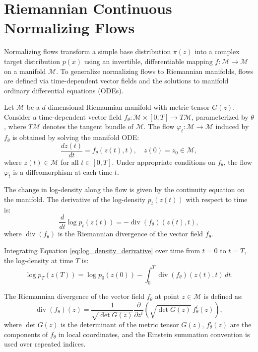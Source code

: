 \documentclass[a4paper,14pt]{article}
\renewcommand{\phi}{\ensuremath{\varphi}}
\theoremstyle{plain} %
\theoremstyle{definition} %
\theoremstyle{remark} %
\begin{document}
	\section{Riemannian Continuous Normalizing Flows}
	
	Normalizing flows transform a simple base distribution $\pi(z)$ into a complex target distribution $p(x)$ using an invertible, differentiable mapping $f: \mathcal{M} \rightarrow \mathcal{M}$ on a manifold $\mathcal{M}$. To generalize normalizing flows to Riemannian manifolds, flows are defined via time-dependent vector fields and the solutions to manifold ordinary differential equations (ODEs).
	
	Let $\mathcal{M}$ be a $d$-dimensional Riemannian manifold with metric tensor $G(z)$. Consider a time-dependent vector field $f_\theta: \mathcal{M} \times [0, T] \rightarrow T\mathcal{M}$, parameterized by $\theta$, where $T\mathcal{M}$ denotes the tangent bundle of $\mathcal{M}$. The flow $\phi_t: \mathcal{M} \rightarrow \mathcal{M}$ induced by $f_\theta$ is obtained by solving the manifold ODE:
	\begin{equation}
		\frac{dz(t)}{dt} = f_\theta(z(t), t), \quad z(0) = z_0 \in \mathcal{M},
		\label{eq:manifold_ode}
	\end{equation}
	where $z(t) \in \mathcal{M}$ for all $t \in [0, T]$. Under appropriate conditions on $f_\theta$, the flow $\phi_t$ is a diffeomorphism at each time $t$.
	
	The change in log-density along the flow is given by the continuity equation on the manifold. The derivative of the log-density $p_t(z(t))$ with respect to time is:
	\begin{equation}
		\frac{d}{dt} \log p_t(z(t)) = -\operatorname{div}(f_\theta)(z(t), t),
		\label{eq:log_density_derivative}
	\end{equation}
	where $\operatorname{div}(f_\theta)$ is the Riemannian divergence of the vector field $f_\theta$.
	
	Integrating Equation \eqref{eq:log_density_derivative} over time from $t = 0$ to $t = T$, the log-density at time $T$ is:
	\begin{equation}
		\log p_T(z(T)) = \log p_0(z(0)) - \int_0^T \operatorname{div}(f_\theta)(z(t), t) \, dt.
		\label{eq:log_density}
	\end{equation}
	
	The Riemannian divergence of the vector field $f_\theta$ at point $z \in \mathcal{M}$ is defined as:
	\begin{equation}
		\operatorname{div}(f_\theta)(z) = \frac{1}{\sqrt{\det G(z)}} \frac{\partial}{\partial z^i} \left( \sqrt{\det G(z)} \, f_\theta^i(z) \right),
		\label{eq:riemannian_divergence}
	\end{equation}
	where $\det G(z)$ is the determinant of the metric tensor $G(z)$, $f_\theta^i(z)$ are the components of $f_\theta$ in local coordinates, and the Einstein summation convention is used over repeated indices.
	
\end{document}
